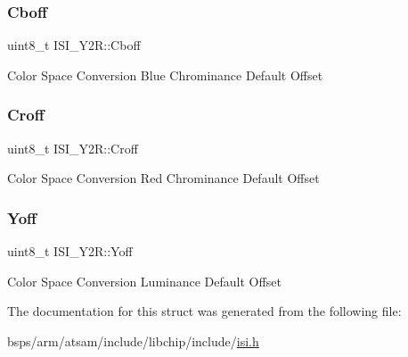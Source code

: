 \subsubsection{\texorpdfstring{Cboff}{Cboff}}
{\footnotesize\ttfamily uint8\+\_\+t I\+S\+I\+\_\+\+Y2\+R\+::\+Cboff}

Color Space Conversion Blue Chrominance Default Offset \mbox{\label{structISI__Y2R_afa783ae7148c71923a526faea3078b32}} 
\subsubsection{\texorpdfstring{Croff}{Croff}}
{\footnotesize\ttfamily uint8\+\_\+t I\+S\+I\+\_\+\+Y2\+R\+::\+Croff}

Color Space Conversion Red Chrominance Default Offset \mbox{\label{structISI__Y2R_a79368aeb1f48a134e484914b7d4e109e}} 
\subsubsection{\texorpdfstring{Yoff}{Yoff}}
{\footnotesize\ttfamily uint8\+\_\+t I\+S\+I\+\_\+\+Y2\+R\+::\+Yoff}

Color Space Conversion Luminance Default Offset 

The documentation for this struct was generated from the following file\+:\begin{DoxyCompactItemize}
\item 
bsps/arm/atsam/include/libchip/include/\mbox{\hyperlink{isi_8h}{isi.\+h}}\end{DoxyCompactItemize}
